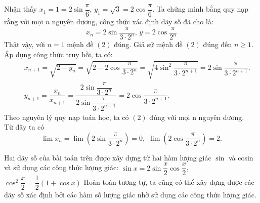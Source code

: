 \begin{bt}
{		 
		Nhận thấy $x_1= 1 = 2\sin \dfrac{\pi }{6}$, ${y_1} = \sqrt 3  = 2\cos\dfrac{\pi }{6}$. Ta chứng minh bằng quy nạp rằng với mọi $n$ nguyên dương, công thức xác định dãy số đã cho là:
		\[x_n = 2\sin \dfrac{\pi }{{3\cdot 2}^n},\,y = 2\cos\dfrac{\pi }{2^n}\tag{2}\]
		Thật vậy, với $n = 1$ mệnh đề $(2)$ đúng. Giả sử mệnh đề $(2)$ đúng đến $n \geq 1$. Áp dụng công thức truy hồi, ta có:
		\begin{eqnarray*}
			&&{x_{n + 1}} = \sqrt {2 - y_n}  = \sqrt {2 - 2\cos\dfrac{\pi }{{3\cdot 2}^n}}  = \sqrt {4{{\sin }^2}\dfrac{\pi }{{3\cdot 2}^{n + 1}}}  = 2\sin \dfrac{\pi }{{3\cdot 2}^{n + 1}}.\\
			&&{y_{n + 1}} = \dfrac{{x_n}}{x_{n + 1}} = \dfrac{2\sin \dfrac{\pi }{{3\cdot 2}^n}}{2\sin \dfrac{\pi }{{3\cdot 2}^{n + 1}}} = 2 \cos\dfrac{\pi }{{3\cdot 2}^{n + 1}}.
		\end{eqnarray*}
		Theo nguyên lý quy nạp toán học, ta có $(2)$ đúng với mọi n nguyên dương.\\
		Từ đây ta có \[\lim\limits x_n = \lim\limits \left( {2\sin \dfrac{\pi }{{3\cdot 2}^n}} \right) = 0,\,\,\lim\limits \left( {2 \cos\dfrac{\pi }{{3\cdot 2}^n}} \right) = 2.\]
	}	
\end{bt}
\begin{nx}
	Hai dãy số của bài toán trên được xây dựng từ hai hàm lượng giác $\sin$ và cosin và sử dụng các công thức lượng giác:
	$\sin x = 2\sin \dfrac{x}{2}\cos\dfrac{x}{2}$, $\cos^2\dfrac{x}{2} = \dfrac{1}{2}(1 +\cos x)$
	Hoàn toàn tương tự, ta cũng có thể xây dựng được các dãy số xác định bởi các hàm số lượng giác nhờ sử dụng các công thức lượng giác.
\end{nx}

